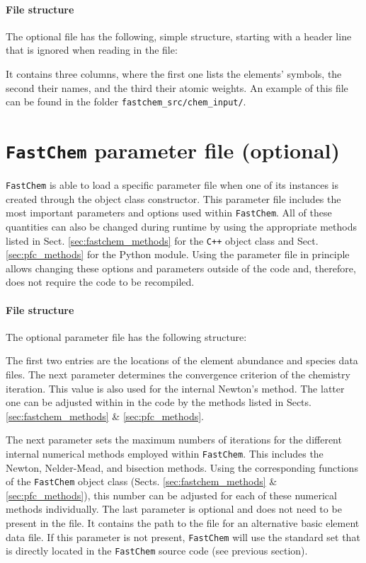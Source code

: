 \documentclass[numbers=noenddot]{aux/fcmanual}
\newcommand{\fc}{\texttt{FastChem}\xspace}
\newcommand{\cpp}{\ttt{C++}\xspace}
\newcommand{\ttt}[1]{\texttt {#1}}
\begin{document}
\paragraph{File structure}
The optional file has the following, simple structure, starting with a header line that is ignored when reading in the file:

It contains three columns, where the first one lists the elements' symbols, the second their names, and the third their atomic weights. An example of this file can be found in the folder \texttt{fastchem\_src/chem\_input/}.


\section{\fc parameter file (optional)}
\label{sec:fc_parameter_file}
\fc is able to load a specific parameter file when one of its instances is created through the object class constructor. This parameter file includes the most important parameters and options used within \fc. All of these quantities can also be changed during runtime by using the appropriate methods listed in Sect. \ref{sec:fastchem_methods} for the \cpp object class and Sect. \ref{sec:pfc_methods} for the Python module. Using the parameter file in principle allows changing these options and parameters outside of the code and, therefore, does not require the code to be recompiled.

\paragraph{File structure}
The optional parameter file has the following structure:

The first two entries are the locations of the element abundance and species data files. The next parameter determines the convergence criterion of the chemistry iteration. This value is also used for the internal Newton's method. The latter one can be adjusted within in the code by the methods listed in Sects. \ref{sec:fastchem_methods} \& \ref{sec:pfc_methods}.

The next parameter sets the maximum numbers of iterations for the different internal numerical methods employed within \fc. This includes the Newton, Nelder-Mead, and bisection methods. Using the corresponding functions of the \fc object class (Sects. \ref{sec:fastchem_methods} \& \ref{sec:pfc_methods}), this number can be adjusted for each of these numerical methods individually. 
The last parameter is optional and does not need to be present in the file. It contains the path to the file for an alternative basic element data file. If this parameter is not present, \fc will use the standard set that is directly located in the \fc source code (see previous section).
\end{document}
